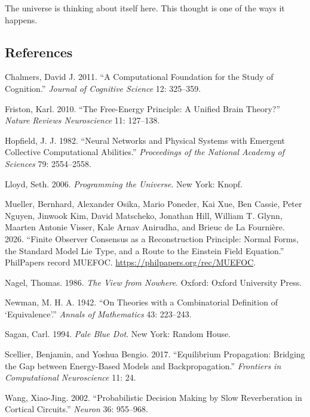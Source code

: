 \documentclass[
  11pt,
]{article}
\begin{document}
The universe is thinking about itself here. This thought is one of the
ways it happens.

\subsection{References}\label{references}

Chalmers, David J. 2011. ``A Computational Foundation for the Study of
Cognition.'' \emph{Journal of Cognitive Science} 12: 325--359.

Friston, Karl. 2010. ``The Free-Energy Principle: A Unified Brain
Theory?'' \emph{Nature Reviews Neuroscience} 11: 127--138.

Hopfield, J. J. 1982. ``Neural Networks and Physical Systems with
Emergent Collective Computational Abilities.'' \emph{Proceedings of the
National Academy of Sciences} 79: 2554--2558.

Lloyd, Seth. 2006. \emph{Programming the Universe}. New York: Knopf.

Mueller, Bernhard, Alexander Osika, Mario Poneder, Kai Xue, Ben Cassie, Peter
Nguyen, Jinwook Kim, David Matscheko, Jonathan Hill, William T. Glynn, Maarten
Antonie Visser, Kale Arnav Anirudha, and Brieuc de La Fournière. 2026. ``Finite
Observer Consensus as a Reconstruction Principle: Normal Forms, the Standard
Model Lie Type, and a Route to the Einstein Field Equation.'' PhilPapers record
MUEFOC. \url{https://philpapers.org/rec/MUEFOC}.

Nagel, Thomas. 1986. \emph{The View from Nowhere}. Oxford: Oxford
University Press.

Newman, M. H. A. 1942. ``On Theories with a Combinatorial Definition of
`Equivalence'.'' \emph{Annals of Mathematics} 43: 223--243.

Sagan, Carl. 1994. \emph{Pale Blue Dot}. New York: Random House.

Scellier, Benjamin, and Yoshua Bengio. 2017. ``Equilibrium Propagation:
Bridging the Gap between Energy-Based Models and Backpropagation.''
\emph{Frontiers in Computational Neuroscience} 11: 24.

Wang, Xiao-Jing. 2002. ``Probabilistic Decision Making by Slow
Reverberation in Cortical Circuits.'' \emph{Neuron} 36: 955--968.
\end{document}
